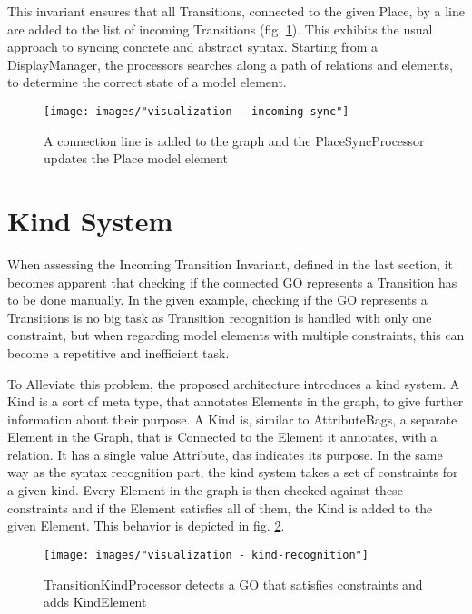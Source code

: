 This invariant ensures that all Transitions, connected to the given Place, by a line are added to the list of incoming Transitions (fig. \ref{fig:incoming-sync}). This exhibits the usual approach to syncing concrete and abstract syntax. Starting from a DisplayManager, the processors searches along a path of relations and elements, to determine the correct state of a model element.


\begin{figure}
  \centering
  \texttt{[image: images/"visualization - incoming-sync"]}
  \caption{A connection line is added to the graph and the PlaceSyncProcessor updates the Place model element}
  \label{fig:incoming-sync}
\end{figure}


\section{Kind System}

When assessing the Incoming Transition Invariant, defined in the last section, it becomes apparent that checking if the connected GO represents a Transition has to be done manually. In the given example, checking if the GO represents a Transitions is no big task as Transition recognition is handled with only one constraint, but when regarding model elements with multiple constraints, this can become a repetitive and inefficient task. 

To Alleviate this problem, the proposed architecture introduces a kind system. A Kind is a sort of meta type, that annotates Elements in the graph, to give further information about their purpose. A Kind is, similar to AttributeBags, a separate Element in the Graph, that is Connected to the Element it annotates, with a relation. It has a single value Attribute, das indicates its purpose. In the same way as the syntax recognition part, the kind system takes a set of constraints for a given kind. Every Element in the graph is then checked against these constraints and if the Element satisfies all of them, the Kind is added to the given Element. This behavior is depicted in fig. \ref{fig:kind-recognition}.

\begin{figure}
  \centering
  \texttt{[image: images/"visualization - kind-recognition"]}
  \caption{TransitionKindProcessor detects a GO that satisfies constraints and adds KindElement}
  \label{fig:kind-recognition}
\end{figure}


